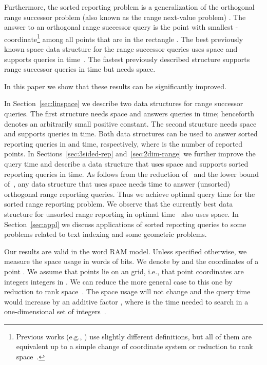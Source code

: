 \documentclass[11pt]{article}
\newcommand{\no}[1]{}
\newcommand{\nono}[1]{}
\newcommand{\todo}[1]{ TO DO:  #1 \newline}
\begin{document}
Furthermore, the sorted reporting problem is a generalization of the 
orthogonal range successor problem (also known as the range next-value problem) \cite{LenhofS94,CrochemoreIR07,KKL07wads,IliopoulosCKRW08,Yu:2011}. 
The answer to an orthogonal range successor query  
is the point with smallest -coordinate\footnote{Previous works (e.g., \cite{CrochemoreIR07,Yu:2011}) use slightly different definitions, but all of them are equivalent up to a simple change of coordinate system or reduction to rank space~\cite{GabowBT84}.} among all points that are 
in the rectangle . The best previously known  space  data structure 
for the range 
successor queries uses  space and supports queries in
  time~\cite{Yu:2011}. The fastest previously described 
structure  supports range successor queries in  
time but needs  space. 
\no{
A data structure that answers range successor queries in time  can also 
answer sorted reporting queries in  time; see the proof of Theorem~\ref{theor:spaceeff}.
Thus the linear space structure of~\cite{Yu:2011} answers queries in  time.}
 In this paper we show that these results can be significantly improved. 


In Section~\ref{sec:linspace} we describe two data structures for range 
successor queries.  The first structure needs  space and answers 
 queries in  time; henceforth  denotes an arbitrarily small positive constant. The second structure  needs 
 space and supports  queries in  
time. Both data structures can be used to answer sorted reporting queries 
in  and  time, respectively, where  is the number of reported points.
In Sections~\ref{sec:3sided-rep} and~\ref{sec:2dim-range} we further improve the query time and describe a data 
structure that uses  space and supports sorted reporting 
queries in  time.  As follows from the reduction of~\cite{MNSW98} and the lower bound of~\cite{PT06}, any data structure that uses  space needs 
 time to answer  (unsorted) orthogonal range reporting queries. Thus we achieve optimal query time for the sorted range reporting 
problem.  We observe that the currently best data structure 
for unsorted range reporting in optimal time~\cite{ChanLP11} also 
uses  space.
In Section~\ref{sec:appl} we discuss applications of sorted reporting queries to some problems related to text indexing and some geometric problems. 
\nono{Further applications are described in the full version of this paper~\cite{NN12full}.}

Our results are valid in the word RAM model. Unless specified otherwise, we measure the space usage in words of  
bits. We denote by  and  the coordinates of a point . We assume that points lie on an  grid, i.e., that point coordinates are integers
integers in . We can reduce the more general case to this one by
reduction to rank space~\cite{GabowBT84}. The space usage will not change
and the query time would increase by an additive factor 
, where  is the time needed to search in a one-dimensional set of integers~\cite{BoasKZ77,PT06}.
\no{
\todo{Say that we can iterate and report only k leftmost points, k unknown in advance, say it better than in the 1st paragraph}
\todo{Say about applications,  say that we report points sorted by -coordinates}
}
\end{document}
